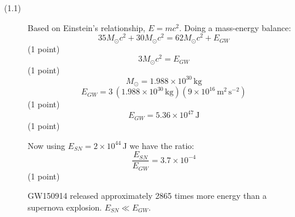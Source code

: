 \begin{description}
\item[(1.1)] Based on Einstein's relationship, $E = mc^2$. Doing a mass-energy
  balance:
  \[ 35 M_\odot c^2 + 30 M_\odot c^2 = 62 M_\odot c^2 + E_{GW} \]
  \hfill(1 point)
  \[ 3 M_\odot c^2 = E_{GW} \]
  \hfill(1 point)
  \[ M_\odot = 1.988 \times 10^{30}\,\mathrm{kg} \]
  \[ E_{GW} = 3\,(1.988 \times 10^{30}\,\mathrm{kg})
     (9 \times 10^{16}\,\mathrm{m^2\,s^{-2}}) \]
  \hfill(1 point)
  \[ E_{GW} = 5.36 \times 10^{47}\,\mathrm{J} \]
  \hfill(1 point)

  Now using $E_{SN} = 2 \times 10^{44}$\,J we have the ratio:
  \[ \frac{E_{SN}}{E_{GW}} = 3.7 \times 10^{-4} \]
  \hfill(1 point)

  GW150914 released approximately 2865 times more energy than a supernova
  explosion. $E_{SN} \ll E_{GW}$.
\end{description}
